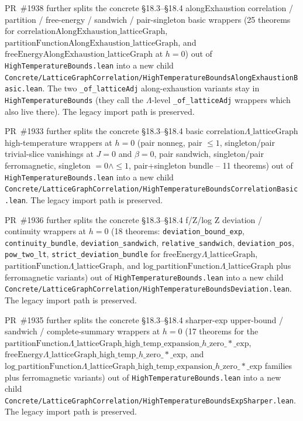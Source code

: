 \documentclass[a4paper,11pt]{article}
\begin{document}
PR~\#1938 further splits the concrete §18.3--§18.4 alongExhaustion
correlation / partition / free-energy / sandwich / pair-singleton basic
wrappers (25 theorems for
$\mathrm{correlationAlongExhaustion}\_\mathrm{latticeGraph}$,
$\mathrm{partitionFunctionAlongExhaustion}\_\mathrm{latticeGraph}$, and
$\mathrm{freeEnergyAlongExhaustion}\_\mathrm{latticeGraph}$ at $h = 0$)
out of \texttt{HighTemperatureBounds.lean} into a new child
\texttt{Concrete/LatticeGraphCorrelation/HighTemperatureBoundsAlongExhaustionBasic.lean}.
The two \texttt{\_of\_latticeAdj} along-exhaustion variants stay in
\texttt{HighTemperatureBounds} (they call the $\Lambda$-level
\texttt{\_of\_latticeAdj} wrappers which also live there). The legacy
import path is preserved.

PR~\#1933 further splits the concrete §18.3--§18.4 basic
$\mathrm{correlation}\Lambda\_\mathrm{latticeGraph}$ high-temperature
wrappers at $h = 0$ (pair nonneg, pair $\le 1$, singleton/pair trivial-slice
vanishings at $J = 0$ and $\beta = 0$, pair sandwich, singleton/pair
ferromagnetic, singleton $= 0 \wedge \le 1$, pair+singleton bundle --
11 theorems) out of \texttt{HighTemperatureBounds.lean} into a new child
\texttt{Concrete/LatticeGraphCorrelation/HighTemperatureBoundsCorrelationBasic.lean}.
The legacy import path is preserved.

PR~\#1936 further splits the concrete §18.3--§18.4 f/Z/log Z
deviation / continuity wrappers at $h = 0$ (18 theorems:
\texttt{deviation\_bound\_exp}, \texttt{continuity\_bundle},
\texttt{deviation\_sandwich}, \texttt{relative\_sandwich},
\texttt{deviation\_pos}, \texttt{pow\_two\_lt},
\texttt{strict\_deviation\_bundle} for
$\mathrm{freeEnergy}\Lambda\_\mathrm{latticeGraph}$,
$\mathrm{partitionFunction}\Lambda\_\mathrm{latticeGraph}$, and
$\mathrm{log}\_\mathrm{partitionFunction}\Lambda\_\mathrm{latticeGraph}$ plus
ferromagnetic variants) out of \texttt{HighTemperatureBounds.lean} into
a new child
\texttt{Concrete/LatticeGraphCorrelation/HighTemperatureBoundsDeviation.lean}.
The legacy import path is preserved.

PR~\#1935 further splits the concrete §18.3--§18.4 sharper-exp
upper-bound / sandwich / complete-summary wrappers at $h = 0$
(17 theorems for the
$\mathrm{partitionFunction}\Lambda\_\mathrm{latticeGraph}\_\mathrm{high}\_\mathrm{temp}\_\mathrm{expansion}\_h\_\mathrm{zero}\_*\_\mathrm{exp}$,
$\mathrm{freeEnergy}\Lambda\_\mathrm{latticeGraph}\_\mathrm{high}\_\mathrm{temp}\_h\_\mathrm{zero}\_*\_\mathrm{exp}$, and
$\mathrm{log}\_\mathrm{partitionFunction}\Lambda\_\mathrm{latticeGraph}\_\mathrm{high}\_\mathrm{temp}\_\mathrm{expansion}\_h\_\mathrm{zero}\_*\_\mathrm{exp}$
families plus ferromagnetic variants) out of
\texttt{HighTemperatureBounds.lean} into a new child
\texttt{Concrete/LatticeGraphCorrelation/HighTemperatureBoundsExpSharper.lean}.
The legacy import path is preserved.
\end{document}
